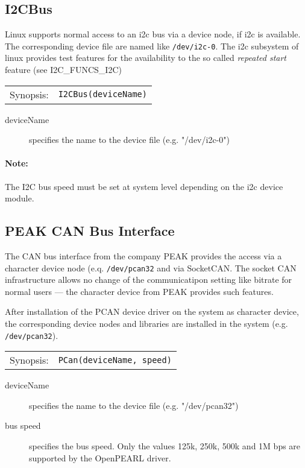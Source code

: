 \subsection{I2CBus}
Linux supports normal access to an i2c bus via a device node,
 if i2c is available. 
The corresponding device file are named like \texttt{/dev/i2c-0}.
The i2c subsystem of linux provides test features for the availability
to the so called {\em repeated start} feature (see I2C\_FUNCS\_I2C)

\begin{tabular}{ll}
Synopsis: & \verb|I2CBus(deviceName)|\\ 
\end{tabular}

\begin{description}
\item[deviceName] specifies the name to the device file (e.g. "/dev/i2c-0")
\end{description}

\paragraph{Note:}
The I2C bus speed must be set at system level depending on the 
i2c device module.


\subsection{PEAK CAN Bus Interface}
The CAN bus interface from the company PEAK provides the access via a character 
device node (e.q. \texttt{/dev/pcan32} and via SocketCAN.
The socket CAN infrastructure allows no change of the communicatipon setting
like bitrate for normal users --- the character device from PEAK provides
such features.

After installation of the PCAN device driver on the system as character 
device, the corresponding device nodes and libraries are installed 
in the system (e.g. \verb|/dev/pcan32|).


\begin{tabular}{ll}
Synopsis: & \verb|PCan(deviceName, speed)|\\ 
\end{tabular}

\begin{description}
\item[deviceName] specifies the name to the device file (e.g. "/dev/pcan32")
\item[bus speed] specifies the bus speed. 
Only the values 125k, 250k, 500k and 1M bps are supported by 
the OpenPEARL driver.
\end{description}

